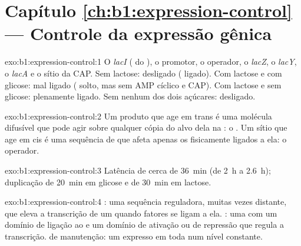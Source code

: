 \section*{Capítulo \ref{ch:b1:expression-control} --- Controle da expressão gênica}

\begin{solution}{exo:b1:expression-control:1}
O \emph{lacI} ( do ), o promotor, o operador, o
\emph{lacZ}, o \emph{lacY}, o \emph{lacA} e o sítio da CAP. Sem lactose:
desligado ( ligado). Com lactose e com glicose: mal ligado
( solto, mas sem AMP cíclico e CAP). Com lactose e sem glicose:
plenamente ligado. Sem nenhum dos dois açúcares: desligado.
\end{solution}

\begin{solution}{exo:b1:expression-control:2}
Um produto que age em trans é uma molécula difusível que pode agir sobre
qualquer cópia do alvo dela na : o . Um sítio que age em
cis é uma sequência de  que afeta apenas os  fisicamente ligados
a ela: o operador.
\end{solution}

\begin{solution}{exo:b1:expression-control:3}
Latência de cerca de \qty{36}{min} (de \qty{2}{h} a \qty{2.6}{h});
duplicação de \qty{20}{min} em glicose e de \qty{30}{min} em lactose.
\end{solution}

\begin{solution}{exo:b1:expression-control:4}
: uma sequência reguladora, muitas vezes distante, que
eleva a transcrição de um  quando fatores se ligam a ela. : uma  com um domínio de ligação ao  e um domínio
de ativação ou de repressão que regula a transcrição.  de
manutenção: um  expresso em toda  num nível constante.
\end{solution}

